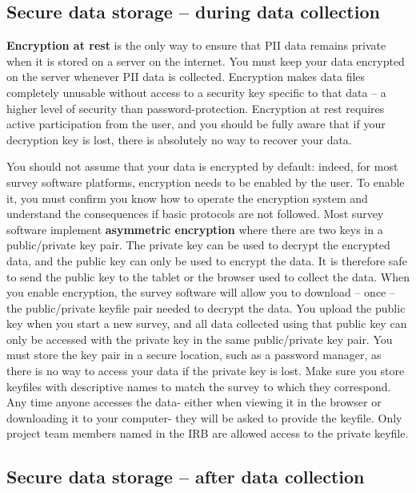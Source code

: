 \subsection{Secure data storage -- during data collection}
\textbf{Encryption at rest}
is the only way to ensure that PII data remains private when it is stored on a
server on the internet. You must keep your data encrypted on the server 
whenever PII data is collected. Encryption makes data files completely unusable 
without access to a security key specific to that data -- a higher level of security
than password-protection. Encryption at rest requires active participation from 
the user, and you should be fully aware that if your decryption key is lost, there 
is absolutely no way to recover your data.

You should not assume that your data is encrypted by default: indeed, for most survey
software platforms, encryption needs to be enabled by the user. To enable it, you must
confirm you know how to operate the encryption system and understand the consequences 
if basic protocols are not followed. Most survey software implement \textbf{asymmetric 
encryption}
where there are two keys in a public/private key pair. The private key can be used to
decrypt the encrypted data, and the public key can only be used to encrypt the data.
It is therefore safe to send the public key to the tablet or the browser used to 
collect the data. When you enable encryption, the survey software will allow you to 
download -- once -- the public/private keyfile pair needed to decrypt the data. You 
upload the public key when you start a new survey, and all data collected using that
public key can only be accessed with the private key in the same public/private key 
pair. You must store the key pair in a secure location, such as a password manager, as 
there is no way to access your data if the private key is lost. Make sure you store 
keyfiles with descriptive names to match the survey to which they correspond. Any time 
anyone accesses the data- either when viewing it in the browser or downloading it to 
your computer- they will be asked to provide the keyfile. Only project team members 
named in the IRB are allowed access to the private keyfile.

\subsection{Secure data storage -- after data collection}

